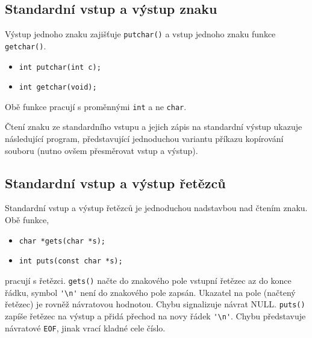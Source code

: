     \subsection{Standardní vstup a výstup znaku}
      Výstup jednoho znaku zajišťuje \lstinline[basicstyle=\ttfamily]!putchar()! a vstup jednoho 
      znaku funkce \lstinline[basicstyle=\ttfamily]!getchar()!.
      \begin{itemize}
        \item \lstinline[basicstyle=\ttfamily]!int putchar(int c);!
        \item \lstinline[basicstyle=\ttfamily]!int getchar(void);!
      \end{itemize}
      Obě funkce pracují s proměnnými \lstinline[basicstyle=\ttfamily]!int! a ne 
      \lstinline[basicstyle=\ttfamily]!char!.
  
         
      
      \begin{example}Čtení znaku ze standardního vstupu a jejich zápis na standardní výstup 
        ukazuje následující program, představující jednoduchou variantu příkazu kopírování souboru 
        (nutno ovšem přesměrovat vstup a výstup).
  
        
      \end{example}
      
    \subsection{Standardní vstup a výstup řetězců}
      Standardní vstup a výstup řetězců je jednoduchou nadstavbou nad čtením znaku. Obě funkce,
      \begin{itemize}
        \item \lstinline[basicstyle=\ttfamily]!char *gets(char *s);!
        \item \lstinline[basicstyle=\ttfamily]!int puts(const char *s);!
      \end{itemize}
      pracují s řetězci. \texttt{gets()} načte do znakového pole vstupní řetězec az do konce řádku, 
      symbol  \lstinline[basicstyle=\ttfamily]!'\n'! není do znakového pole zapsán. Ukazatel na 
      pole (načtený řetězec) je rovněž návratovou hodnotou. Chybu signalizuje návrat NULL. 
      \texttt{puts()} 
      zapíše řetězec na výstup a přidá přechod na novy řádek       
      \lstinline[basicstyle=\ttfamily]!'\n'!. Chybu představuje návratové \texttt{EOF}, jinak vrací 
      kladné cele číslo.
  
